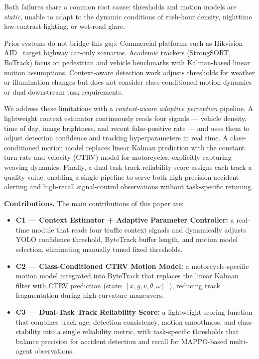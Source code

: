 Both failures share a common root cause: thresholds and motion models
are \emph{static}, unable to adapt to the dynamic conditions of
rush-hour density, nighttime low-contrast lighting, or wet-road glare.

Prior systems do not bridge this gap.
Commercial platforms such as Hikvision AID~\cite{Hikvision_AID} target
highway car-only scenarios.
Academic trackers (StrongSORT, BoTrack) focus on pedestrian and vehicle
benchmarks with Kalman-based linear motion assumptions.
Context-aware detection work adjusts thresholds for weather or
illumination changes but does not consider class-conditioned motion
dynamics or dual downstream task requirements.

We address these limitations with a \emph{context-aware adaptive
perception} pipeline.
A lightweight context estimator continuously reads four signals
--- vehicle density, time of day, image brightness, and recent
false-positive rate --- and uses them to adjust detection confidence
and tracking hyperparameters in real time.
A class-conditioned motion model replaces linear Kalman prediction
with the constant turn-rate and velocity (CTRV) model for motorcycles,
explicitly capturing weaving dynamics.
Finally, a dual-task track reliability score assigns each track a
quality value, enabling a single pipeline to serve both high-precision
accident alerting and high-recall signal-control observations without
task-specific retuning.

\noindent\textbf{Contributions.}
The main contributions of this paper are:

\begin{itemize}
  \item \textbf{C1 — Context Estimator + Adaptive Parameter Controller:}
        a real-time module that reads four traffic context signals and
        dynamically adjusts YOLO confidence threshold, ByteTrack buffer
        length, and motion model selection, eliminating manually tuned
        fixed thresholds.

  \item \textbf{C2 — Class-Conditioned CTRV Motion Model:}
        a motorcycle-specific motion model integrated into ByteTrack
        that replaces the linear Kalman filter with CTRV prediction
        (state: $[x, y, v, \theta, \omega]^\top$), reducing track
        fragmentation during high-curvature maneuvers.

  \item \textbf{C3 — Dual-Task Track Reliability Score:}
        a lightweight scoring function that combines track age,
        detection consistency, motion smoothness, and class stability
        into a single reliability metric, with task-specific thresholds
        that balance precision for accident detection and recall for
        MAPPO-based multi-agent observations.
\end{itemize}

